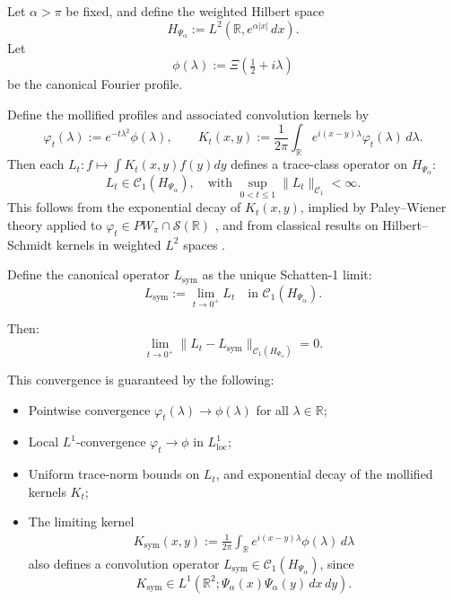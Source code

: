\begin{lemma}
\label{lem:trace-norm-convergence-Lt-to-Lsym}
Let \( \alpha > \pi \) be fixed, and define the weighted Hilbert space
\[
H_{\Psi_\alpha} := L^2(\mathbb{R}, e^{\alpha|x|}\, dx).
\]
Let
\[
\phi(\lambda) := \Xi\left( \tfrac{1}{2} + i\lambda \right)
\]
be the canonical Fourier profile.

Define the mollified profiles and associated convolution kernels by
\[
\varphi_t(\lambda) := e^{-t\lambda^2} \phi(\lambda), \qquad
K_t(x,y) := \frac{1}{2\pi} \int_{\mathbb{R}} e^{i(x - y)\lambda} \varphi_t(\lambda)\, d\lambda.
\]
Then each \( L_t \colon f \mapsto \int K_t(x,y) f(y) dy \) defines a trace-class operator on \( H_{\Psi_\alpha} \):
\[
L_t \in \mathcal{C}_1(H_{\Psi_\alpha}), \quad \text{with } \sup_{0 < t \le 1} \|L_t\|_{\mathcal{C}_1} < \infty.
\]
This follows from the exponential decay of \( K_t(x,y) \), implied by Paley--Wiener theory applied to \( \varphi_t \in PW_\pi \cap \mathcal{S}(\mathbb{R}) \) \cite[Thm.~IX.12]{ReedSimon1975II}, and from classical results on Hilbert--Schmidt kernels in weighted \( L^2 \) spaces \cite[Ch.~4]{Simon2005TraceIdeals}.

\medskip

Define the canonical operator \( L_{\mathrm{sym}} \) as the unique Schatten-1 limit:
\[
L_{\mathrm{sym}} := \lim_{t \to 0^+} L_t \quad \text{in } \mathcal{C}_1(H_{\Psi_\alpha}).
\]

Then:
\[
\lim_{t \to 0^+} \| L_t - L_{\mathrm{sym}} \|_{\mathcal{C}_1(H_{\Psi_\alpha})} = 0.
\]

\medskip

\noindent
This convergence is guaranteed by the following:
\begin{itemize}
  \item Pointwise convergence \( \varphi_t(\lambda) \to \phi(\lambda) \) for all \( \lambda \in \mathbb{R} \);
  \item Local \( L^1 \)-convergence \( \varphi_t \to \phi \) in \( L^1_{\mathrm{loc}} \);
  \item Uniform trace-norm bounds on \( L_t \), and exponential decay of the mollified kernels \( K_t \);
  \item The limiting kernel
  \begin{multline*}
  K_{\mathrm{sym}}(x,y) := \frac{1}{2\pi} \int_{\mathbb{R}} 
  e^{i(x-y)\lambda} \phi(\lambda)\, d\lambda
  \end{multline*}
  also defines a convolution operator \( L_{\mathrm{sym}} \in \mathcal{C}_1(H_{\Psi_\alpha}) \), since
  \[
  K_{\mathrm{sym}} \in L^1(\mathbb{R}^2; \Psi_\alpha(x)\Psi_\alpha(y)\,dx\,dy).
  \]
\end{itemize}


\end{lemma}
